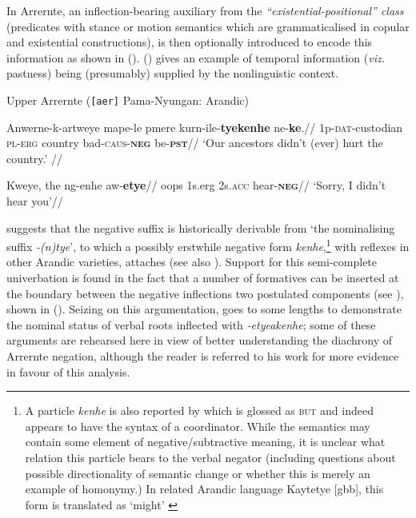 In Arrernte, an inflection-bearing auxiliary from the \textit{``existential-positional'' class} (predicates with stance or motion semantics which are grammaticalised in copular and existential constructions), is then optionally introduced to encode this information as shown in (). () gives an example of temporal information (\textit{viz.} pastness) being (presumably) supplied by the nonlinguistic context.

\pex\label{sn-aec} Upper Arrernte (\texttt{[aer]} Pama-Nyungan: Arandic)

\a\begingl \gla Anwerne-k-artweye mape-le pmere kurn-ile-\textbf{tyekenhe} ne-\textbf{ke}.//
\glb 1p\textsc{-dat-}custodian \textsc{pl-erg} country bad\textsc{-caus-\textbf{neg}} be-\textsc{\textbf{pst}}//
\glft`Our ancestors didn't (ever) hurt the country.' //\endgl



\a\begingl\gla Kweye, the ng-enhe aw-\textbf{etye}//
\glb oops 1s.\gls{erg} 2s.\textsc{acc} hear-\textbf{\textsc{neg}}//
\glft`Sorry, I didn't hear you'//\endgl

\xe

\citet[235, fn 17]{Wilkins1989} suggests that the negative suffix is historically derivable from `the nominalising suffix \textit{-(n)tye}', to which a possibly erstwhile negative form \textit{kenhe},\footnote{A particle \textit{kenhe} is also reported by \citet[372]{Wilkins1989} which is glossed as \textsc{but} and indeed appears to have the syntax of a coordinator. While the semantics may contain some element of negative/subtractive meaning, it is unclear what relation this particle bears to the verbal negator (including questions about possible directionality of semantic change or whether this is merely an example of homonymy.) In related Arandic language Kaytetye [\gls{gbb}], this form is translated as `might' \citep[424]{KaytetyeDict}} with reflexes in other Arandic varieties, attaches (see also \citealt[275]{Yallop1977}). Support for this semi-complete univerbation is found in the fact that a number of formatives can be inserted at the boundary between the negative inflections two postulated components (see \citealt[378\textit{ff}]{Wilkins1989}), shown in (). Seizing on this argumentation, \citet[411-26]{Henderson2013} goes to some lengths to demonstrate the nominal status of verbal roots inflected with \textit{-etye\textdblhyphen akenhe}; some of these arguments are rehearsed here in view of better understanding the diachrony of Arrernte negation, although the reader is referred to his work for more evidence in favour of this analysis.

